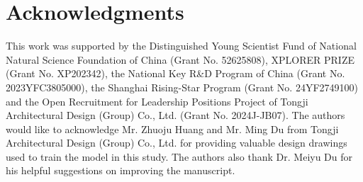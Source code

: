 \documentclass[final,5p,times,twocolumn, fleqn]{elsarticle}
\begin{document}
\section*{Acknowledgments}
This work was supported by the Distinguished Young Scientist Fund of National Natural Science Foundation of China (Grant No. 52625808), XPLORER PRIZE (Grant No.
XP202342), the National Key R\&D Program of China (Grant No. 2023YFC3805000), the Shanghai Rising-Star Program (Grant No. 24YF2749100) and the Open Recruitment for Leadership Positions Project of Tongji Architectural Design (Group) Co., Ltd. (Grant No. 2024J-JB07). The authors would like to acknowledge Mr. Zhuoju Huang and Mr. Ming Du from Tongji Architectural Design (Group) Co., Ltd. for providing valuable design drawings used to train the model in this study. The authors also thank Dr. Meiyu Du for his helpful suggestions on improving the manuscript.


\clearpage
\onecolumn

\clearpage

\twocolumn
 






\end{document}
